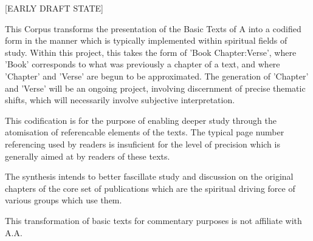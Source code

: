 \begin{fmatterchapter}


[EARLY DRAFT STATE]

This Corpus transforms the presentation of the Basic Texts of A 
    into a codified form 
    in the manner which is typically implemented 
    within spiritual fields of study.
Within this project, this takes the form of 'Book Chapter:Verse', 
    where 'Book' corresponds to what was previously a chapter of a text, 
    and where 'Chapter' and 'Verse' are begun to be approximated.
The generation of 'Chapter' and 'Verse' will be an ongoing project,
    involving discernment of precise thematic shifts,
    which will necessarily involve subjective interpretation.

This codification is for the purpose of enabling deeper study 
    through the atomisation of referencable elements of the texts. 
The typical page number referencing used by readers 
    is insuficient for the level of precision 
    which is generally aimed at by readers of these texts.

The synthesis intends to better fascillate study and discussion 
    on the original chapters of the core set of publications 
    which are the spiritual driving force of various groups which use them.

This transformation of basic texts for commentary purposes 
    is not affiliate with A.A.


\end{fmatterchapter}
